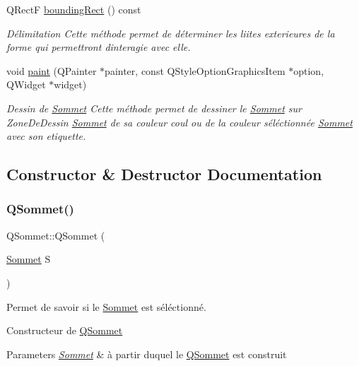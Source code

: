 \begin{DoxyCompactItemize}
Q\+RectF \hyperlink{classQSommet_a17d6341ca386c11f916830bcfab85f3d}{bounding\+Rect} () const
\begin{DoxyCompactList}\small\item\em D\'{e}limitation Cette m\'{e}thode permet de d\'{e}terminer les liites exterieures de la forme qui permettront d\textquotesingle{}interagie avec elle. \end{DoxyCompactList}\item 
\mbox{\label{classQSommet_a44a0d7e8f9f3c93ce311dce971924d63}} 
void \hyperlink{classQSommet_a44a0d7e8f9f3c93ce311dce971924d63}{paint} (Q\+Painter $\ast$painter, const Q\+Style\+Option\+Graphics\+Item $\ast$option, Q\+Widget $\ast$widget)
\begin{DoxyCompactList}\small\item\em Dessin de \hyperlink{classSommet}{Sommet} Cette m\'{e}thode permet de dessiner le \hyperlink{classSommet}{Sommet} sur Zone\+De\+Dessin \hyperlink{classSommet}{Sommet} de sa couleur coul ou de la couleur s\'{e}l\'{e}ctionn\'{e}e \hyperlink{classSommet}{Sommet} avec son etiquette. \end{DoxyCompactList}\end{DoxyCompactItemize}


\subsection{Constructor \& Destructor Documentation}
\mbox{\label{classQSommet_a859b1416dbbd9613d4404d623718e921}} 
\subsubsection{\texorpdfstring{Q\+Sommet()}{QSommet()}\hspace{0.1cm}{\footnotesize\ttfamily [1/2]}}
{\footnotesize\ttfamily Q\+Sommet\+::\+Q\+Sommet (\begin{DoxyParamCaption}\item[{\hyperlink{classSommet}{Sommet}}]{S }\end{DoxyParamCaption})}



Permet de savoir si le \hyperlink{classSommet}{Sommet} est s\'{e}l\'{e}ctionn\'{e}. 

Constructeur de \hyperlink{classQSommet}{Q\+Sommet} 
\begin{DoxyParams}{Parameters}
{\em \hyperlink{classSommet}{Sommet}} & \`{a} partir duquel le \hyperlink{classQSommet}{Q\+Sommet} est construit \\
\hline
\end{DoxyParams}
\mbox{\label{classQSommet_ab7db8d44889e696e226e9b5913418915}} 
